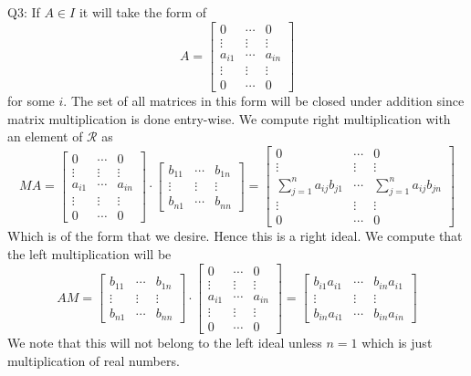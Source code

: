\documentclass[letterpaper]{article}
\begin{document}
 
\noindent Q3: If $A\in I$ it will take the form of $$A = \begin{bmatrix}
    0 & \cdots & 0 \\ \vdots  & \vdots & \vdots \\ a_{i1} & \cdots & a_{in} \\ \vdots & \vdots & \vdots \\ 0 & \cdots & 0
\end{bmatrix}$$
 for some $i$. The set of all matrices in this form will be closed under addition since matrix multiplication is done entry-wise. We compute right multiplication with an element of $\mathcal{R}$ as 
 $$MA = \begin{bmatrix}
    0 & \cdots & 0 \\ \vdots  & \vdots & \vdots \\ a_{i1} & \cdots & a_{in} \\ \vdots & \vdots & \vdots \\ 0 & \cdots & 0
\end{bmatrix} \cdot \begin{bmatrix}
    b_{11} & \cdots & b_{1n} \\ \vdots & \vdots & \vdots \\ b_{n1} & \cdots & b_{nn}
 \end{bmatrix} = \begin{bmatrix}
    0 & \cdots & 0 \\ \vdots & \vdots & \vdots \\ \sum_{j=1}^n a_{ij}b_{j1} & \cdots & \sum_{j=1}^n a_{ij}b_{jn} \\ \vdots &\vdots & \vdots \\ 0 & \cdots & 0  
 \end{bmatrix} $$
 Which is of the form that we desire. Hence this is a right ideal. We compute that the left multiplication will be 
 $$AM = \begin{bmatrix}
    b_{11} & \cdots & b_{1n} \\ \vdots & \vdots & \vdots \\ b_{n1} & \cdots & b_{nn}
 \end{bmatrix} \cdot \begin{bmatrix}
    0 & \cdots & 0 \\ \vdots  & \vdots & \vdots \\ a_{i1} & \cdots & a_{in} \\ \vdots & \vdots & \vdots \\ 0 & \cdots & 0
\end{bmatrix}= \begin{bmatrix}
    b_{i1}a_{i1} & \cdots & b_{in}a_{i1} \\ \vdots & \vdots & \vdots \\ b_{in}a_{i1} & \cdots & b_{in}a_{in}

\end{bmatrix}$$ We note that this will not belong to the left ideal unless $n=1$ which is just multiplication of real numbers. 
\end{document}
